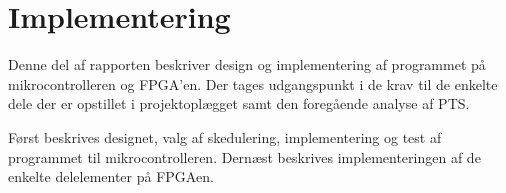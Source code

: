 \part{Implementering}
Denne del af rapporten beskriver design og implementering af programmet på mikrocontrolleren og FPGA'en. Der tages udgangspunkt i de krav til de enkelte dele der er opstillet i projektoplægget samt den foregående analyse af PTS. 

Først beskrives designet, valg af skedulering,  implementering og test af programmet til mikrocontrolleren. Dernæst beskrives implementeringen af de enkelte delelementer på FPGAen.


%